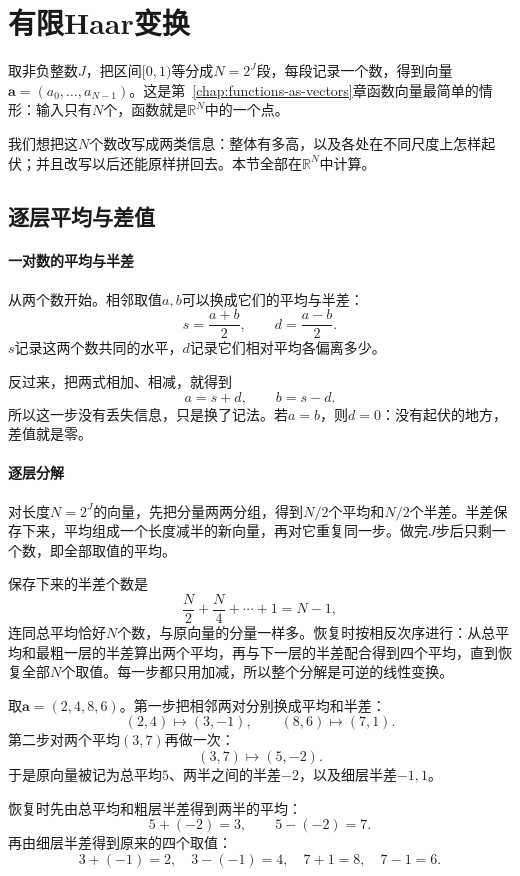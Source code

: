 \section{有限Haar变换}
\label{sec:wavelet-finite-haar}

取非负整数$J$，把区间$[0,1)$等分成$N=2^J$段，每段记录一个数，得到向量$\bm a=(a_0,\ldots,a_{N-1})$。这是第~\ref{chap:functions-as-vectors}章函数向量最简单的情形：输入只有$N$个，函数就是$\mathbb R^N$中的一个点。

我们想把这$N$个数改写成两类信息：整体有多高，以及各处在不同尺度上怎样起伏；并且改写以后还能原样拼回去。本节全部在$\mathbb R^N$中计算。

\subsection{逐层平均与差值}
\label{sec:wavelet-average-difference}

\paragraph{一对数的平均与半差}
从两个数开始。相邻取值$a,b$可以换成它们的平均与半差：
\begin{equation}
 s=\frac{a+b}{2},\qquad d=\frac{a-b}{2}.
 \label{eq:wavelet-average-difference}
\end{equation}
$s$记录这两个数共同的水平，$d$记录它们相对平均各偏离多少。

反过来，把两式相加、相减，就得到
\[
 a=s+d,\qquad b=s-d.
\]
所以这一步没有丢失信息，只是换了记法。若$a=b$，则$d=0$：没有起伏的地方，差值就是零。

\paragraph{逐层分解}
对长度$N=2^J$的向量，先把分量两两分组，得到$N/2$个平均和$N/2$个半差。半差保存下来，平均组成一个长度减半的新向量，再对它重复同一步。做完$J$步后只剩一个数，即全部取值的平均。

保存下来的半差个数是
\[
 \frac N2+\frac N4+\cdots+1=N-1,
\]
连同总平均恰好$N$个数，与原向量的分量一样多。恢复时按相反次序进行：从总平均和最粗一层的半差算出两个平均，再与下一层的半差配合得到四个平均，直到恢复全部$N$个取值。每一步都只用加减，所以整个分解是可逆的线性变换。

\begin{example}[四个取值的平均与半差]
\label{ex:wavelet-four-values-average}
取$\bm a=(2,4,8,6)$。第一步把相邻两对分别换成平均和半差：
\[
 (2,4)\mapsto(3,-1),\qquad(8,6)\mapsto(7,1).
\]
第二步对两个平均$(3,7)$再做一次：
\[
 (3,7)\mapsto(5,-2).
\]
于是原向量被记为总平均$5$、两半之间的半差$-2$，以及细层半差$-1,1$。

恢复时先由总平均和粗层半差得到两半的平均：
\[
 5+(-2)=3,\qquad 5-(-2)=7.
\]
再由细层半差得到原来的四个取值：
\[
 3+(-1)=2,\quad3-(-1)=4,\quad7+1=8,\quad7-1=6.
\]
\end{example}

